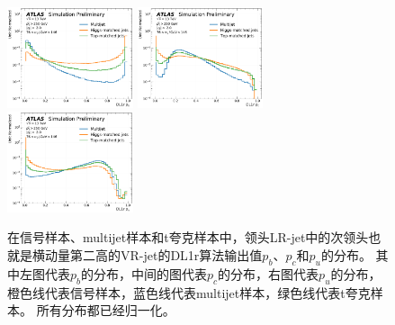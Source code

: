 \begin{figure}[h]
    \includegraphics[width=0.33\textwidth]{figuresXbb/samples/inputs_aux/dl1r_pb_2_norm.pdf}
    \includegraphics[width=0.33\textwidth]{figuresXbb/samples/inputs_aux/dl1r_pc_2_norm.pdf}
    \includegraphics[width=0.33\textwidth]{figuresXbb/samples/inputs_aux/dl1r_pu_2_norm.pdf}
  \caption{在信号样本、multijet样本和t夸克样本中，领头LR-jet中的次领头也就是横动量第二高的VR-jet的DL1r算法输出值$p_b$、$p_c$和$p_u$的分布。
其中左图代表$p_b$的分布，中间的图代表$p_c$的分布，右图代表$p_u$的分布，橙色线代表信号样本，蓝色线代表multijet样本，绿色线代表t夸克样本。
所有分布都已经归一化。}
\label{fig:DL1RLLD}
\end{figure}

